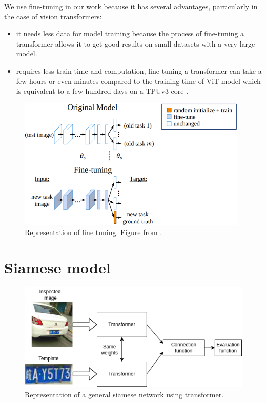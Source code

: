 \documentclass{report}[12pt, a4paper]
\begin{document}
We use fine-tuning in our work because it has several advantages, particularly in the case of vision transformers:

\begin{itemize}
    \item it needs less data for model training because the process of fine-tuning a transformer allows it to get good results on small datasets with a very large model.
    \item requires less train time and computation, fine-tuning a transformer can take a few hours or even minutes compared to the training time of ViT model which is equivalent to a few hundred days on a TPUv3 core \cite{vit_paper}.
\end{itemize}

\begin{figure}[htp]
    \centering
    \includegraphics[width=11cm]{fine_tuning}
\caption{Representation of fine tuning. Figure from \cite{learning_without_forgetting}.}
    \label{fig:fine_tuning}
\end{figure}


\section{Siamese model}

\begin{figure}[htp]
    \centering
    \includegraphics[width=12cm]{siamese_transformer}
    \caption{Representation of a general siamese network using transformer.}
    \label{fig:siamese_transformer}
\end{figure}
\end{document}
